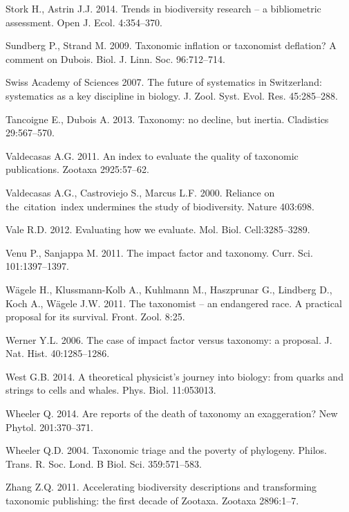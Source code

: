 \documentclass[webpdf,PV,mynatbib,surname,CE,MSC]{SYS-PV}
\begin{document}
\begin{thebibliography}{}
Stork H., Astrin J.J. 2014. Trends in biodiversity research -- a bibliometric assessment. Open J.
Ecol. 4:354--370.

Sundberg P., Strand M. 2009. Taxonomic inflation or taxonomist deflation? A comment on Dubois.
Biol. J. Linn. Soc. 96:712--714.

Swiss Academy of Sciences 2007. The future of systematics in Switzerland: systematics as a key
discipline in biology. J. Zool. Syst. Evol. Res. 45:285--288.

Tancoigne E., Dubois A. 2013. Taxonomy: no decline, but inertia. Cladistics 29:567--570.

Valdecasas A.G. 2011. An index to evaluate the quality of taxonomic publications. Zootaxa
2925:57--62.

Valdecasas A.G., Castroviejo S., Marcus L.F. 2000. Reliance on the~citation~index undermines the
study of biodiversity. Nature 403:698.

Vale R.D. 2012. Evaluating how we evaluate. Mol. Biol. Cell:3285--3289.

Venu P., Sanjappa M. 2011. The impact factor and taxonomy. Curr. Sci. 101:1397--1397.

W\"{a}gele H., Klussmann-Kolb A., Kuhlmann M., Haszprunar G., Lindberg D., Koch A., W\"{a}gele
J.W. 2011. The taxonomist -- an\vvp{} endangered race. A practical proposal for its survival. Front.
Zool. 8:25.

Werner Y.L. 2006. The case of impact factor versus taxonomy: a proposal. J. Nat. Hist.
40:1285--1286.

West G.B. 2014. A theoretical physicist's journey into biology: from quarks and strings to cells
and whales. Phys. Biol. 11:053013.

Wheeler Q. 2014. Are reports of the death of taxonomy an exaggeration? New Phytol. 201:370--371.

Wheeler Q.D. 2004. Taxonomic triage and the poverty of phylogeny. Philos. Trans. R. Soc. Lond. B
Biol. Sci. 359:571--583.

Zhang Z.Q. 2011. Accelerating biodiversity descriptions and transforming taxonomic publishing: the
first decade of Zootaxa. Zootaxa 2896:1--7.

\end{thebibliography}
\end{document}
